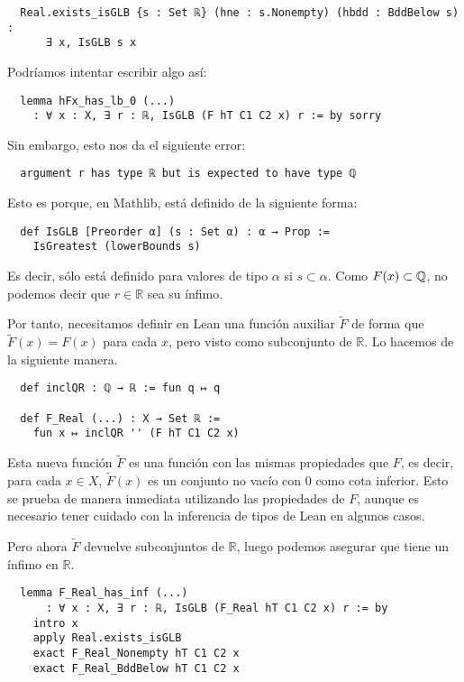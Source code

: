 \begin{lstlisting}
  Real.exists_isGLB {s : Set ℝ} (hne : s.Nonempty) (hbdd : BddBelow s) :
      ∃ x, IsGLB s x
\end{lstlisting}

Podríamos intentar escribir algo así:

\begin{lstlisting}
  lemma hFx_has_lb_0 (...)
    : ∀ x : X, ∃ r : ℝ, IsGLB (F hT C1 C2 x) r := by sorry
\end{lstlisting}

Sin embargo, esto nos da el siguiente error:

\begin{lstlisting}
  argument r has type ℝ but is expected to have type ℚ
\end{lstlisting}

Esto es porque, en Mathlib,  está definido de la siguiente forma:

\begin{lstlisting}
  def IsGLB [Preorder α] (s : Set α) : α → Prop :=
    IsGreatest (lowerBounds s)
\end{lstlisting}

Es decir, sólo está definido para valores de tipo $\alpha$ si $s \subset \alpha$. Como $F(x) \subset \mathbb{Q}$, no podemos decir que $r \in \mathbb{R}$ sea su ínfimo.

Por tanto, necesitamos definir en Lean una función auxiliar $\tilde{F}$ de forma que $\tilde{F}(x) = F(x)$ para cada $x$, pero visto como subconjunto de $\mathbb{R}$. Lo hacemos de la siguiente manera.

\begin{lstlisting}
  def inclQR : ℚ → ℝ := fun q ↦ q

  def F_Real (...) : X → Set ℝ :=
    fun x ↦ inclQR '' (F hT C1 C2 x)
\end{lstlisting}

Esta nueva función $\tilde{F}$ es una función con las mismas propiedades que $F$, es decir, para cada $x \in X$, $\tilde{F}(x)$ es un conjunto no vacío con $0$ como cota inferior. Esto se prueba de manera inmediata utilizando las propiedades de $F$, aunque es necesario tener cuidado con la inferencia de tipos de Lean en algunos casos.

Pero ahora $\tilde{F}$ devuelve subconjuntos de $\mathbb{R}$, luego podemos asegurar que tiene un ínfimo en $\mathbb{R}$.

\begin{lstlisting}
  lemma F_Real_has_inf (...)
      : ∀ x : X, ∃ r : ℝ, IsGLB (F_Real hT C1 C2 x) r := by
    intro x
    apply Real.exists_isGLB
    exact F_Real_Nonempty hT C1 C2 x
    exact F_Real_BddBelow hT C1 C2 x
\end{lstlisting}


